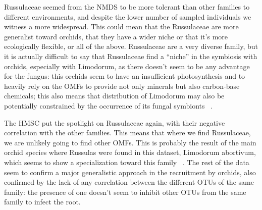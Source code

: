 Russulaceae seemed from the NMDS to be more tolerant than other families to different environments, and despite the lower number of sampled individuals we witness a more widespread. This could mean that the Russulaceae are more generalist toward orchids, that they have a wider niche or that it's more ecologically flexible, or all of the above. Russulaceae are a very diverse family, but it is actually difficult to say that Russulaceae find a ``niche'' in the symbiosis with orchids, especially with Limodorum, as there doesn't seem to be any advantage for the fungus: this orchids seem to have an insufficient photosynthesis and to heavily rely on the OMFs to provide not only minerals but also carbon-base chemicals; this also means that distribution of Limodorum may also be potentially constrained by the occurrence of its fungal symbionts ~\citep{girlanda2005}.

The HMSC put the spotlight on Russulaceae again, with their negative correlation with the other families. This means that where we find Russulaceae, we are unlikely going to find other OMFs. This is probably the result of the main orchid species where Russulas were found in this dataset, Limodorum abortivum, which seems to show a specialization toward this family ~\citep{girlanda2005}. The rest of the data seem to confirm a major generalistic approach in the recruitment by orchids, also confirmed by the lack of any correlation between the different OTUs of the same family: the presence of one doesn't seem to inhibit other OTUs from the same family to infect the root.




